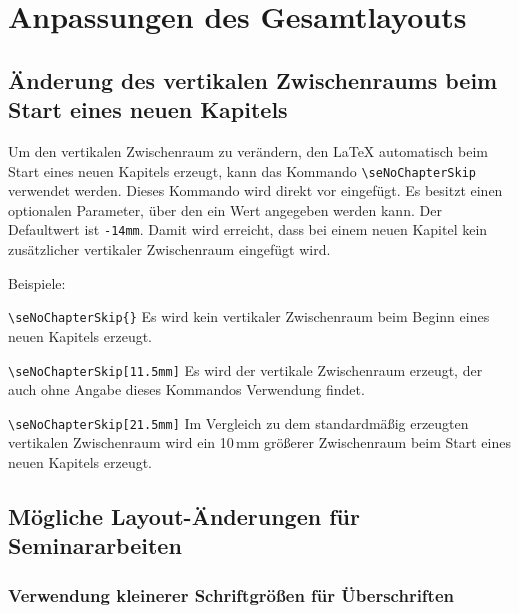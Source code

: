 \section{Anpassungen des Gesamtlayouts}

\subsection{\"Anderung des vertikalen Zwischenraums beim Start eines neuen Kapitels}

Um den vertikalen Zwischenraum zu ver\"andern, den \LaTeX{} automatisch beim 
Start eines neuen Kapitels erzeugt, kann das Kommando \verb+\seNoChapterSkip+ 
verwendet werden. Dieses Kommando wird direkt vor \verb++ eingef\"ugt.
Es besitzt einen optionalen Parameter, \"uber den ein Wert angegeben werden kann. Der 
Defaultwert ist \texttt{-14mm}. Damit wird erreicht, dass bei einem neuen Kapitel kein 
zus\"atzlicher vertikaler Zwischenraum eingef\"ugt wird. 

Beispiele:

\begin{seList}
\item
\verb+\seNoChapterSkip{}+\newline \verb++ \newline
Es wird kein vertikaler Zwischenraum beim Beginn eines neuen Kapitels erzeugt.
\item
\verb+\seNoChapterSkip[11.5mm]+\newline \verb++ \newline
Es wird der vertikale Zwischenraum erzeugt, der auch ohne Angabe dieses 
Kommandos Verwendung findet.
\item
\verb+\seNoChapterSkip[21.5mm]+\newline \verb++ \newline
Im Vergleich zu dem standardm\"a{\ss}ig erzeugten vertikalen Zwischenraum 
wird ein 10\,mm gr\"o{\ss}erer Zwischenraum beim Start eines neuen Kapitels 
erzeugt.
\end{seList}

\subsection{M\"ogliche Layout-\"Anderungen f\"ur Seminararbeiten}

\subsubsection{Verwendung kleinerer Schriftgr\"o{\ss}en f\"ur \"Uberschriften}

